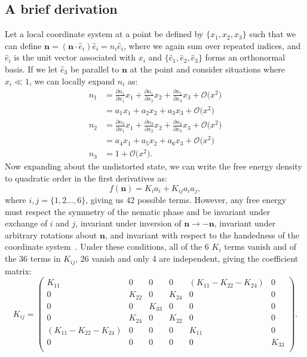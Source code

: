 \subsection{A brief derivation}
Let a local coordinate system at a point be defined by $\{x_1, x_2, x_3 \}$ such that we can define $\mathbf{n} = (\mathbf{n} \cdot \hat{e}_i) \hat{e}_i = n_i\hat{e}_i$, where we again sum over repeated indices, and $\hat{e}_i$ is the unit vector associated with $x_i$ and $\{\hat{e}_1, \hat{e}_2, \hat{e}_3 \}$ forms an orthonormal basis.
If we let $\hat{e}_3$ be parallel to $\mathbf{n}$ at the point and consider situations where $x_i \ll 1$, we can locally expand $n_i$ as:
\begin{align}
  n_1 &= \frac{\partial n_1}{\partial x_1}x_1 + \frac{\partial n_1}{\partial x_2}x_2 + \frac{\partial n_1}{\partial x_3}x_3 + \mathcal{O}\big (x^2 \big ) \nonumber \\
      &= a_1 x_1 + a_2 x_2 + a_3 x_3 + \mathcal{O}\big (x^2 \big )\label{e:2-LocalCoordA}  \\
  n_2 &= \frac{\partial n_2}{\partial x_1}x_1 + \frac{\partial n_2}{\partial x_2}x_2 + \frac{\partial n_2}{\partial x_3}x_3 + \mathcal{O}\big (x^2 \big ) \nonumber  \\
      &= a_4 x_1 + a_5 x_2 + a_6 x_3 + \mathcal{O}\big (x^2 \big )\label{e:2-LocalCoordB}  \\
  n_3 &= 1 + \mathcal{O}\big (x^2 \big ). \nonumber
\end{align}
Now expanding about the undistorted state, we can write the free energy density to quadratic order in the first derivatives as:
\begin{equation}
  f(\mathbf{n}) = K_i a_i + K_{ij} a_i a_j,\label{e:2-FrankGeneralExpansion}
\end{equation}
where $i,j = \{ 1,2 \dots, 6 \}$, giving us 42 possible terms.
However, any free energy must respect the symmetry of the nematic phase and be invariant under exchange of $i$ and $j$, invariant under inversion of $\mathbf{n} \rightarrow -\mathbf{n}$, invariant under arbitrary rotations about $\mathbf{n}$, and invariant with respect to the handedness of the coordinate system~\cite{RN61}.
Under these conditions, all of the 6 $K_i$ terms vanish and of the 36 terms in $K_{ij}$, 26 vanish and only 4 are independent, giving the coefficient matrix:
\begin{equation}
  K_{ij} =
  \begin{pmatrix}
    K_{11} & 0 & 0 & 0 & (K_{11}-K_{22}-K_{24}) & 0 \\
    0 & K_{22} & 0 & K_{24} & 0 & 0 \\
    0 & 0 & K_{33} & 0 & 0 & 0 \\
    0 & K_{24} & 0 & K_{22} & 0 & 0 \\
    (K_{11}-K_{22}-K_{24}) & 0 & 0 & 0 & K_{11} & 0 \\
    0 & 0 & 0 & 0 & 0 & K_{33} \\
  \end{pmatrix}.\label{e:2-Kijreduced}
\end{equation}
